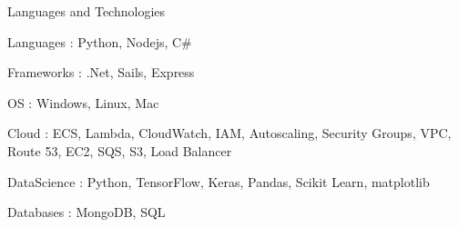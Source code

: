 

\begin{cventries}

  \cventry
    {Languages and Technologies}
    {}
    {}
    {}
    {
      \begin{cvitems} %
        \item {Languages : Python, Nodejs, C\#}
	\item {Frameworks : .Net, Sails, Express}	
	\item {OS : Windows, Linux, Mac}	
	\item {Cloud : ECS, Lambda, CloudWatch, IAM, Autoscaling, Security Groups, VPC, Route 53, EC2, SQS, S3, Load Balancer}	
	\item {DataScience : Python, TensorFlow, Keras, Pandas, Scikit Learn, matplotlib}	
	\item {Databases : MongoDB, SQL}	
      \end{cvitems}
    }

\end{cventries}
